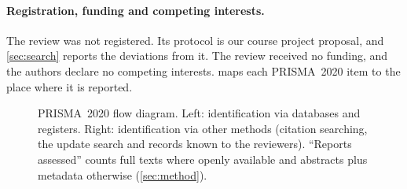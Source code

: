 \paragraph{Registration, funding and competing interests.} The review was not registered. Its protocol is our course project proposal, and \cref{sec:search} reports the deviations from it. The review received no funding, and the authors declare no competing interests.  maps each PRISMA~2020 item to the place where it is reported.

\begin{figure}[p]
\centering

\caption{PRISMA~2020 flow diagram. Left: identification via databases and registers. Right: identification via other methods (citation searching, the update search and records known to the reviewers). ``Reports assessed'' counts full texts where openly available and abstracts plus metadata otherwise (\cref{sec:method}).}
\label{fig:prisma}
\end{figure}
